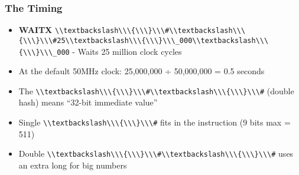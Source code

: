 \documentclass[11pt]{book}
\providecommand{\tightlist}{%
  \setlength{\itemsep}{0pt}\setlength{\parskip}{0pt}}
\providecommand{\passthrough}[1]{#1}
\begin{document}
\hypertarget{the-timing}{%
\subsubsection{The Timing}\label{the-timing}}

\begin{itemize}
\tightlist
\item
  \textbf{WAITX}
  \passthrough{\lstinline!\\textbackslash\\\{\\\}\\\#\\textbackslash\\\{\\\}\\\#25\\textbackslash\\\{\\\}\\\_000\\textbackslash\\\{\\\}\\\_000!}
  - Waits 25 million clock cycles
\item
  At the default 50MHz clock: 25,000,000 ÷ 50,000,000 = 0.5 seconds
\item
  The
  \passthrough{\lstinline!\\textbackslash\\\{\\\}\\\#\\textbackslash\\\{\\\}\\\#!}
  (double hash) means ``32-bit immediate value''
\item
  Single \passthrough{\lstinline!\\textbackslash\\\{\\\}\\\#!} fits in
  the instruction (9 bits max = 511)
\item
  Double
  \passthrough{\lstinline!\\textbackslash\\\{\\\}\\\#\\textbackslash\\\{\\\}\\\#!}
  uses an extra long for big numbers
\end{itemize}
\end{document}
